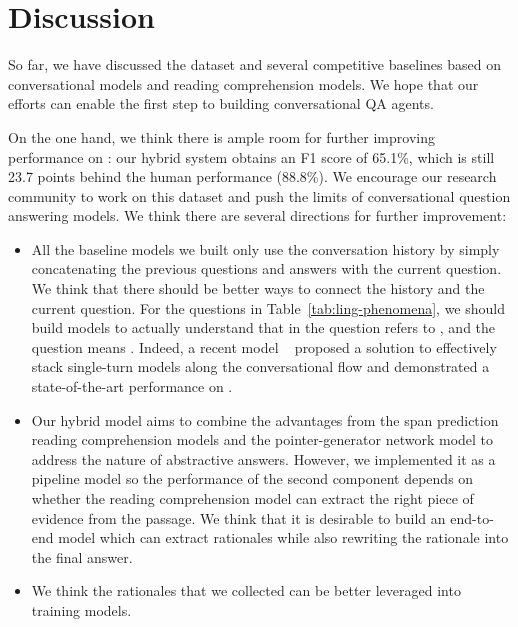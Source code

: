 
\section{Discussion}
\label{sec:coqa-future}

So far, we have discussed the  dataset and several competitive baselines based on conversational models and reading comprehension models. We hope that our efforts can enable the first step to building conversational QA agents.

On the one hand, we think there is ample room for further improving performance on : our hybrid system obtains an F1 score of 65.1\%, which is still 23.7 points behind the human performance (88.8\%). We encourage our research community to work on this dataset and push the limits of conversational question answering models. We think there are several directions for further improvement:

\begin{itemize}
    \item
        All the baseline models we built only use the conversation history by simply concatenating the previous questions and answers with the current question. We think that there should be better ways to connect the history and the current question. For the questions in Table~\ref{tab:ling-phenomena}, we should build models to actually understand that  in the question  refers to , and the question  means . Indeed, a recent model ~\cite{huang2018flowqa} proposed a solution to effectively stack single-turn models along the conversational flow and demonstrated a state-of-the-art performance on .
    \item
        Our hybrid model aims to combine the advantages from the span prediction reading comprehension models and the pointer-generator network model to address the nature of abstractive answers. However, we implemented it as a pipeline model so the performance of the second component depends on whether the reading comprehension model can extract the right piece of evidence from the passage. We think that it is desirable to build an end-to-end model which can extract rationales while also rewriting the rationale into the final answer.
    \item
        We think the rationales that we collected can be better leveraged into training models.
\end{itemize}

